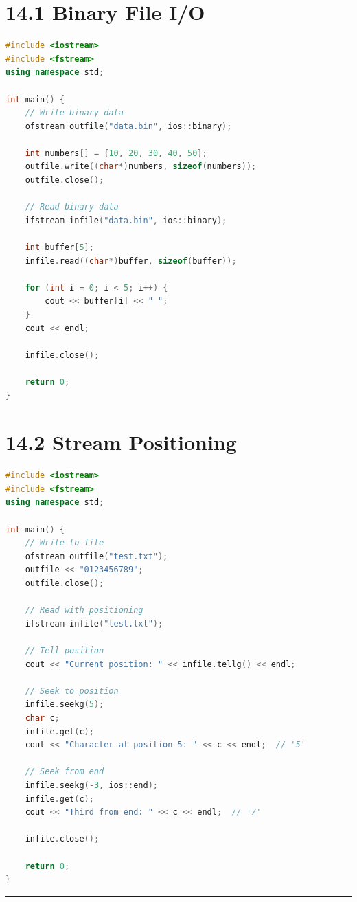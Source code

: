 \hypertarget{binary-file-io}{%
\section{14.1 Binary File I/O}\label{binary-file-io}}

\begin{lstlisting}[language={C++}]
#include <iostream>
#include <fstream>
using namespace std;

int main() {
    // Write binary data
    ofstream outfile("data.bin", ios::binary);
    
    int numbers[] = {10, 20, 30, 40, 50};
    outfile.write((char*)numbers, sizeof(numbers));
    outfile.close();
    
    // Read binary data
    ifstream infile("data.bin", ios::binary);
    
    int buffer[5];
    infile.read((char*)buffer, sizeof(buffer));
    
    for (int i = 0; i < 5; i++) {
        cout << buffer[i] << " ";
    }
    cout << endl;
    
    infile.close();
    
    return 0;
}
\end{lstlisting}

\hypertarget{stream-positioning}{%
\section{14.2 Stream Positioning}\label{stream-positioning}}

\begin{lstlisting}[language={C++}]
#include <iostream>
#include <fstream>
using namespace std;

int main() {
    // Write to file
    ofstream outfile("test.txt");
    outfile << "0123456789";
    outfile.close();
    
    // Read with positioning
    ifstream infile("test.txt");
    
    // Tell position
    cout << "Current position: " << infile.tellg() << endl;
    
    // Seek to position
    infile.seekg(5);
    char c;
    infile.get(c);
    cout << "Character at position 5: " << c << endl;  // '5'
    
    // Seek from end
    infile.seekg(-3, ios::end);
    infile.get(c);
    cout << "Third from end: " << c << endl;  // '7'
    
    infile.close();
    
    return 0;
}
\end{lstlisting}

\begin{center}\rule{0.5\linewidth}{0.5pt}\end{center}
